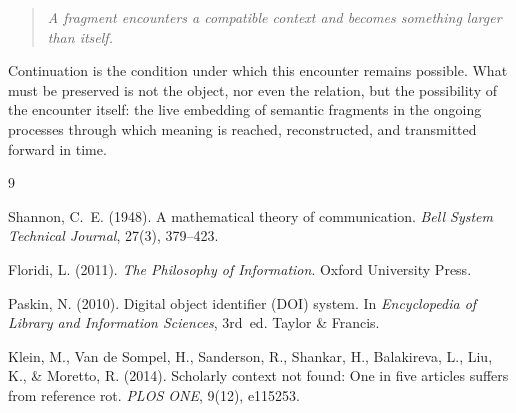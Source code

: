 \documentclass[12pt]{article}
\begin{document}
\begin{quote}
\textit{A fragment encounters a compatible context and becomes something
larger than itself.}
\end{quote}

Continuation is the condition under which this encounter remains possible.
What must be preserved is not the object, nor even the relation, but the
possibility of the encounter itself: the live embedding of semantic
fragments in the ongoing processes through which meaning is reached,
reconstructed, and transmitted forward in time.

\newpage



\begin{thebibliography}{9}

Shannon, C.~E. (1948).
\newblock A mathematical theory of communication.
\newblock \textit{Bell System Technical Journal}, 27(3), 379--423.

Floridi, L. (2011).
\newblock \textit{The Philosophy of Information}.
\newblock Oxford University Press.

Paskin, N. (2010).
\newblock Digital object identifier ({DOI}\textregistered) system.
\newblock In \textit{Encyclopedia of Library and Information Sciences},
  3rd~ed. Taylor \& Francis.

Klein, M., Van de Sompel, H., Sanderson, R., Shankar, H., Balakireva, L.,
  Liu, K., \& Moretto, R. (2014).
\newblock Scholarly context not found: One in five articles suffers from
  reference rot.
\newblock \textit{PLOS ONE}, 9(12), e115253.

\end{thebibliography}
\end{document}
